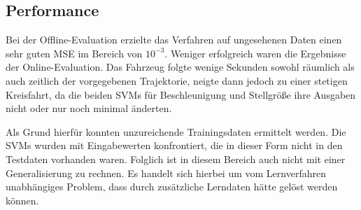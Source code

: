 \subsection{Performance}
\label{subsec:Performance}
Bei der Offline-Evaluation erzielte das Verfahren auf ungesehenen Daten einen sehr guten MSE im Bereich von $10^{-3}$. Weniger erfolgreich waren die Ergebnisse der Online-Evaluation. Das Fahrzeug folgte wenige Sekunden sowohl räumlich als auch zeitlich der vorgegebenen Trajektorie, neigte dann jedoch zu einer stetigen Kreisfahrt, da die beiden SVMs für Beschleunigung und Stellgröße ihre Ausgaben nicht oder nur noch minimal änderten.

Als Grund hierfür konnten unzureichende Trainingsdaten ermittelt werden. Die SVMs wurden mit Eingabewerten konfrontiert, die in dieser Form nicht in den Testdaten vorhanden waren. Folglich ist in diesem Bereich auch nicht mit einer Generalisierung zu rechnen. Es handelt sich hierbei um vom Lernverfahren unabhängiges Problem, dass durch zusätzliche Lerndaten hätte gelöst werden können.



